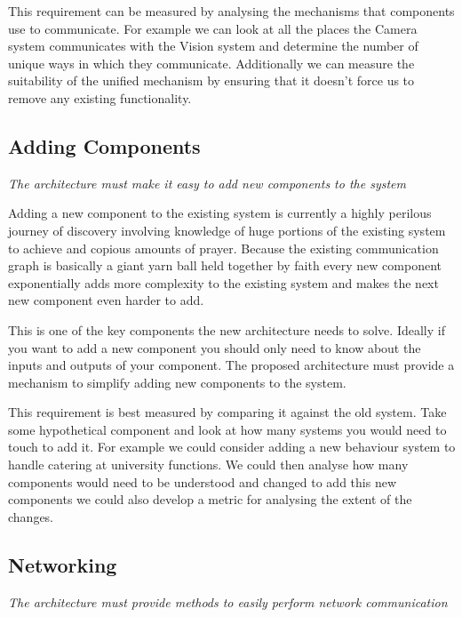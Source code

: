 \documentclass[english,12pt]{scrartcl}
\newcommand{\requirement}[1]{\textit{#1}}
\begin{document}
            This requirement can be measured by analysing the mechanisms that components use to
            communicate. For example we can look at all the places the Camera system communicates
            with the Vision system and determine the number of unique ways in which they
            communicate. Additionally we can measure the suitability of the unified mechanism by
            ensuring that it doesn't force us to remove any existing functionality.
        
        \subsection{Adding Components}
            \requirement{The architecture must make it easy to add new components to the system}
            
            Adding a new component to the existing system is currently a highly perilous journey of
            discovery involving knowledge of huge portions of the existing system to achieve and
            copious amounts of prayer. Because the existing communication graph is basically a giant 
            yarn ball held together by faith every new component exponentially adds more complexity
            to the existing system and makes the next new component even harder to add.
            
            This is one of the key components the new architecture needs to solve. Ideally if you
            want to add a new component you should only need to know about the inputs and outputs of
            your component. The proposed architecture must provide a mechanism to simplify adding
            new components to the system.
            
            This requirement is best measured by comparing it against the old system. Take some
            hypothetical component and look at how many systems you would need to touch to add it.
            For example we could consider adding a new behaviour system to handle catering at
            university functions. We could then analyse how many components would need to be
            understood and changed to add this new components we could also develop a metric for
            analysing the extent of the changes.
            
        
        \subsection{Networking}
            \requirement{The architecture must provide methods to easily perform network
            communication}
            
\end{document}

